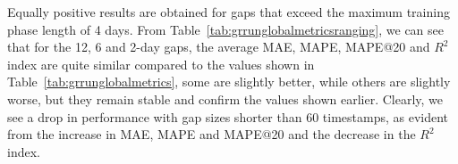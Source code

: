 

Equally positive results are obtained for gaps that exceed the
maximum training phase length of 4 days.
From Table~\ref{tab:grrunglobalmetricsranging}, we can see that for the
12, 6 and 2-day gaps, the average MAE, MAPE, MAPE@20 and $R^2$ index are quite similar compared to the values shown in Table~\ref{tab:grrunglobalmetrics},
some are slightly better, while others are slightly worse, but they remain stable and confirm the values shown earlier.
Clearly, we see a drop in performance with gap sizes shorter than 60 timestamps, as evident from the increase in MAE, MAPE and MAPE@20 and the decrease in the $R^2$ index.


